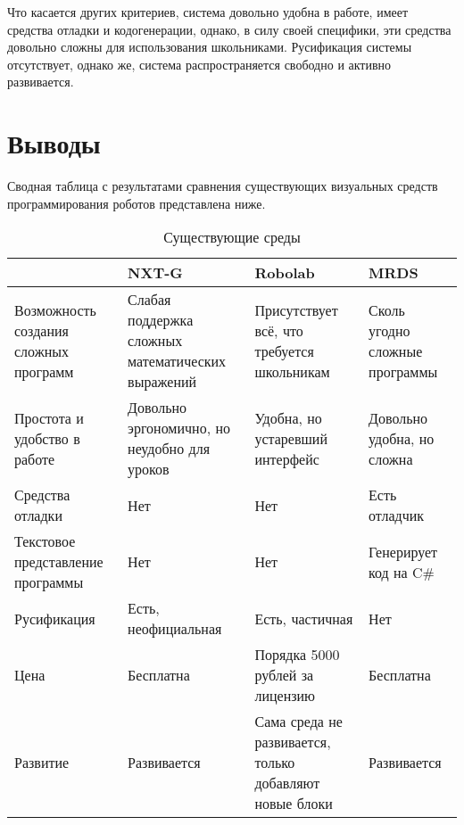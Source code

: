 \documentclass[a4paper]{article}
\begin{document}
Что касается других критериев, система довольно удобна в работе, имеет средства отладки и кодогенерации, однако, в силу своей специфики, эти средства довольно сложны для использования школьниками. Русификация системы отсутствует, однако же, система распространяется свободно и активно развивается.

\section{Выводы}
Сводная таблица с результатами сравнения существующих визуальных средств программирования роботов представлена ниже.

\begin{table}[h]
  \centering
    \begin{tabular} {| p{} | p{} | p{} | p{} |}
      \hline
                                            & NXT-G                                             & Robolab                                                  & MRDS \\
      \hline
      Возможность создания сложных программ & Слабая поддержка сложных математических выражений & Присутствует всё, что требуется школьникам               & Сколь угодно сложные программы \\
      \hline
      Простота и удобство в работе          & Довольно эргономично, но неудобно для уроков      & Удобна, но устаревший интерфейс                          & Довольно удобна, но сложна \\
      \hline
      Средства отладки                      & Нет                                               & Нет                                                      & Есть отладчик \\
      \hline
      Текстовое представление программы     & Нет                                               & Нет                                                      & Генерирует код на C\# \\
      \hline      
      Русификация                           & Есть, неофициальная                               & Есть, частичная                                          & Нет \\
      \hline
      Цена                                  & Бесплатна                                         & Порядка 5000 рублей за лицензию                          & Бесплатна \\
      \hline
      Развитие                              & Развивается                                       & Сама среда не развивается, только добавляют новые блоки  & Развивается \\
      \hline
    \end{tabular}
  \caption{Существующие среды}
  \label{tab:existingTools}
\end{table}
\end{document}
